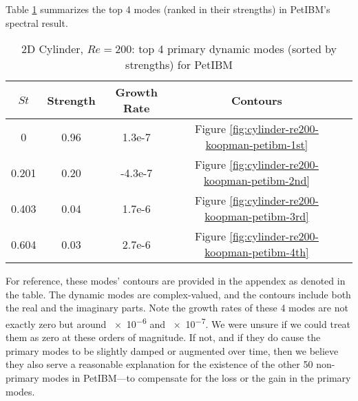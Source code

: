 Table \ref{table:koopman-petibm} summarizes the top 4 modes (ranked in their strengths) in PetIBM's spectral result.
\begin{table}
    \begin{threeparttable}[b]
        \begin{tabular}{ccccc}
            \toprule
            $St$ & Strength & Growth Rate & Contours \\
            \midrule
            0     & 0.96 & 1.3e-7  & Figure \ref{fig:cylinder-re200-koopman-petibm-1st}\\
            0.201 & 0.20 & -4.3e-7 & Figure \ref{fig:cylinder-re200-koopman-petibm-2nd}\\
            0.403 & 0.04 & 1.7e-6  & Figure \ref{fig:cylinder-re200-koopman-petibm-3rd}\\
            0.604 & 0.03 & 2.7e-6  & Figure \ref{fig:cylinder-re200-koopman-petibm-4th}\\
            \bottomrule
        \end{tabular}%
        \caption{%
            2D Cylinder, $Re=200$: top 4 primary dynamic modes (sorted by strengths) for PetIBM%
        }%
        \label{table:koopman-petibm}
    \end{threeparttable}
\end{table}%
For reference, these modes' contours are provided in the appendex as denoted in the table.
The dynamic modes are complex-valued, and the contours include both the real and the imaginary parts.
Note the growth rates of these 4 modes are not exactly zero but around \num{e-6} and \num{e-7}.
We were unsure if we could treat them as zero at these orders of magnitude.
If not, and if they do cause the primary modes to be slightly damped or augmented over time, then we believe they also serve a reasonable explanation for the existence of the other 50 non-primary modes in PetIBM---to compensate for the loss or the gain in the primary modes.


